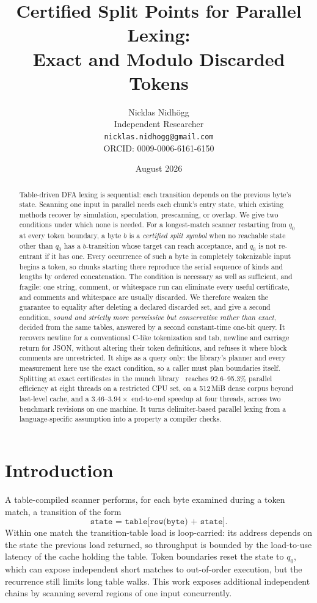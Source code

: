 \documentclass[11pt,a4paper]{article}
\title{Certified Split Points for Parallel Lexing:\\Exact and Modulo Discarded Tokens}
\author{Nicklas Nidh\"ogg\\[0.4em] \normalsize Independent Researcher\\ \normalsize
\texttt{nicklas.nidhogg@gmail.com}\\ \normalsize ORCID: 0009-0006-6161-6150}
\date{August 2026}
\theoremstyle{definition}
\theoremstyle{plain}
\newcommand{\code}[1]{\texttt{#1}}
\begin{document}
\maketitle

\begin{abstract} Table-driven DFA lexing is sequential: each transition depends on the previous byte's state. Scanning
one input in parallel needs each chunk's entry state, which existing methods recover by simulation, speculation,
prescanning, or overlap. We give two conditions under which none is needed. For a longest-match scanner restarting
from $q_0$ at every token boundary, a byte $b$ is a \emph{certified split symbol} when no reachable state other than
$q_0$ has a $b$-transition whose target can reach acceptance, and $q_0$ is not re-entrant if it has one. Every
occurrence of such a byte in completely tokenizable input begins a token, so chunks starting there reproduce the
serial sequence of kinds and lengths by ordered concatenation. The condition is necessary as well as sufficient, and
fragile: one string, comment, or whitespace run can eliminate every useful certificate, and comments and whitespace
are usually discarded. We therefore weaken the guarantee to equality after deleting a declared discarded set, and give
a second condition, \emph{sound and strictly more permissive but conservative rather than exact}, decided from the
same tables, answered by a second constant-time one-bit query. It recovers newline for a conventional C-like
tokenization and tab, newline and carriage return for JSON, without altering their token definitions, and refuses it
where block comments are unrestricted. It ships as a query only: the library's planner and every measurement here use
the exact condition, so a caller must plan boundaries itself. Splitting at exact certificates in the munch
library~\cite{munch} reaches 92.6--95.3\% parallel efficiency at eight threads on a restricted CPU set, on a 512\,MiB
dense corpus beyond last-level cache, and a $3.46$--$3.94\times$ end-to-end speedup at four threads, across two
benchmark revisions on one machine. It turns delimiter-based parallel lexing from a language-specific assumption into
a property a compiler checks.
\end{abstract}

\section{Introduction}

A table-compiled scanner performs, for each byte examined during a token match, a transition of the form \[
\code{state = table[row(byte) + state]}. \] Within one match the transition-table load is loop-carried: its address
depends on the state the previous load returned, so throughput is bounded by the load-to-use latency of the cache
holding the table. Token boundaries reset the state to $q_0$, which can expose independent short matches to
out-of-order execution, but the recurrence still limits long table walks. This work exposes additional independent
chains by scanning several regions of one input concurrently.
\end{document}
